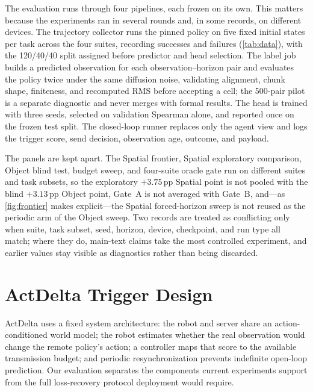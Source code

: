 \documentclass[sigconf,10pt,anonymous,review]{acmart}
\newcommand{\pp}{\,pp}
\begin{document}
The evaluation runs through four pipelines, each frozen on its own. This
matters
because the experiments ran in several rounds and, in some records, on
different devices. The trajectory collector runs the pinned policy on five
fixed initial states per task across the four suites, recording successes and
failures (\cref{tab:data}), with the 120/40/40 split assigned before predictor
and head selection. The label job builds a predicted observation for each
observation--horizon pair and evaluates the policy twice under the same
diffusion noise, validating alignment, chunk shape, finiteness, and recomputed
RMS before accepting a cell; the 500-pair pilot is a separate diagnostic and
never merges with formal results. The head is trained with three seeds,
selected on validation Spearman alone, and reported once on the frozen test
split. The closed-loop runner replaces only the agent view and logs the
trigger score, send decision, observation age, outcome, and payload.

The panels are kept apart. The Spatial frontier, Spatial exploratory
comparison, Object blind test, budget sweep, and four-suite oracle gate run on
different suites and task subsets, so the exploratory $+3.75$\pp{} Spatial
point is not pooled with the blind $+3.13$\pp{} Object point, Gate~A is not
averaged with Gate~B, and---as \cref{fig:frontier} makes explicit---the
Spatial forced-horizon sweep is not reused as the periodic arm of the Object
sweep. Two records are treated as conflicting only when suite, task subset,
seed, horizon, device, checkpoint, and run type all match; where they do, main-text claims take the most controlled experiment, and
earlier values stay visible as diagnostics rather than being discarded.

\section{ActDelta Trigger Design}

ActDelta uses a fixed system architecture: the robot and server share an
action-conditioned world model; the robot estimates whether the real
observation would change the remote policy's action; a controller maps that
score to the available transmission budget; and periodic resynchronization
prevents indefinite open-loop prediction. Our evaluation separates the components current experiments support from the
full loss-recovery protocol deployment would require.
\end{document}
